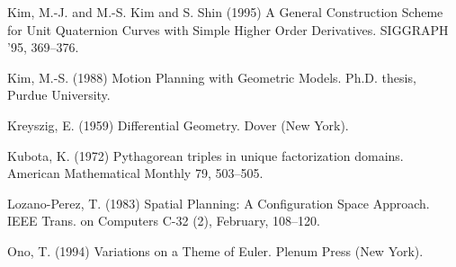 \begin{thebibliography}{Johnstone \& Williams 95}
Kim, M.-J. and M.-S. Kim and S. Shin (1995)
A General Construction Scheme for Unit Quaternion Curves with Simple
Higher Order Derivatives.
SIGGRAPH '95, 369--376.

Kim, M.-S. (1988)
Motion Planning with Geometric Models.
Ph.D. thesis, Purdue University.

Kreyszig, E. (1959) Differential Geometry.
Dover (New York).

Kubota, K. (1972) Pythagorean triples in unique factorization domains.
American Mathematical Monthly 79, 503--505.

Lozano-Perez, T. (1983)
Spatial Planning: A Configuration Space Approach.
IEEE Trans. on Computers C-32 (2), February, 108--120.

Ono, T. (1994) Variations on a Theme of Euler.
Plenum Press (New York).

\end{thebibliography}



